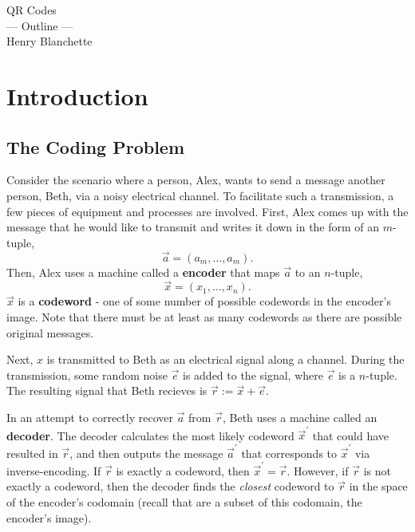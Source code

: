 \documentclass{article}
\renewcommand{\=}{\equiv}
\newcommand{\p}{^\prime}
\renewcommand{\v}{\vec}
\newcommand{\x}{{\v x}}
\begin{document}
\begin{center}
  {\huge\sc QR Codes}
  \\[2em]
  {\Large --- Outline ---}
  \\[2em]
  {\large Henry Blanchette}
\end{center}

\vspace{4em}

\tableofcontents
\newpage

\section{Introduction}

\subsection{The Coding Problem}
Consider the scenario where a person, Alex, wants to send a message another person, Beth, via a noisy electrical channel.
To facilitate such a transmission, a few pieces of equipment and processes are involved.
First, Alex comes up with the message that he would like to transmit and writes it down in the form of an $m$-tuple,
$$ \v a = (a_m, \dots, a_m). $$
Then, Alex uses a machine called a \textbf{encoder} that maps $\v a$ to an $n$-tuple,
$$ \x = (x_1, \dots, x_n). $$
$\x$ is a \textbf{codeword} - one of some number of possible codewords in the encoder's image.
Note that there must be at least as many codewords as there are possible original messages.

Next, $x$ is transmitted to Beth as an electrical signal along a channel.
During the transmission, some random noise $\v e$ is added to the signal, where $\v e$ is a $n$-tuple.
The resulting signal that Beth recieves is $\v r := \x + \v e$.

In an attempt to correctly recover $\v a$ from $\v r$, Beth uses a machine called an \textbf{decoder}.
The decoder calculates the most likely codeword $\x\p$ that could have resulted in $\v r$,
and then outputs the message $\v a\p$ that corresponds to $\x\p$ via inverse-encoding.
If $\v r$ is exactly a codeword, then $\x\p = \v r$.
However, if $\v r$ is not exactly a codeword, then the decoder finds the \textit{closest} codeword to $\v r$ in the space of the encoder's codomain (recall that are a subset of this codomain, the encoder's image).
\end{document}
